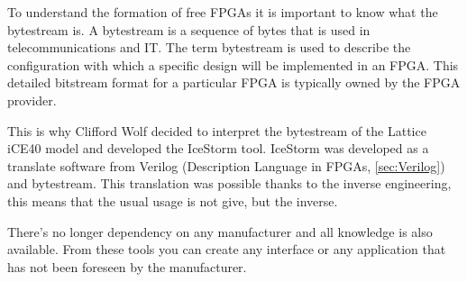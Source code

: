 To understand the formation of free FPGAs it is important to know what the bytestream is. \newline
A bytestream is a sequence of bytes that is used in telecommunications and IT. The term bytestream is used to describe the configuration with which a specific design will be implemented in an FPGA. This detailed bitstream format for a particular FPGA is typically owned by the FPGA provider. \newline

This is why Clifford Wolf decided to interpret the bytestream of the Lattice\cite{Lattice} iCE40 model and developed the IceStorm\cite{7910719} tool. \newline
IceStorm was developed as a translate software from Verilog (Description Language in FPGAs, \ref{sec:Verilog}) and bytestream. This translation was possible thanks to the inverse engineering, this means that the usual usage is not give, but the inverse.

There’s no longer dependency on any manufacturer and all knowledge is also available. From these tools you can create any interface or any application that has not been foreseen by the manufacturer. \newline

